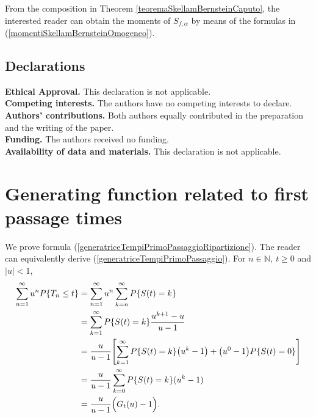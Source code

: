 \documentclass[12pt, twoside, english, headsepline]{article}
\theoremstyle{definition} %
\numberwithin{equation}{section} %
\begin{document}
From the composition in Theorem \ref{teoremaSkellamBernsteinCaputo}, the interested reader can obtain the moments of $S_{f,\alpha}$ by means of the formulas in (\ref{momentiSkellamBernsteinOmogeneo}).




\subsection*{\large{Declarations}}

\textbf{Ethical Approval.} This declaration is not applicable.
 \\
\textbf{Competing interests.}  The authors have no competing interests to declare.
\\
\textbf{Authors' contributions.} Both authors equally contributed in the preparation and the writing of the paper.
 \\
\textbf{Funding.} The authors received no funding.
 \\
\textbf{Availability of data and materials.} This declaration is not applicable.




 \appendix

\section{Generating function related to first passage times}\label{appendiceDimostrazioneFunzioneGeneratriceTempiPrimoPassaggio}

We prove formula (\ref{generatriceTempiPrimoPassaggioRipartizione}). The reader can equivalently derive (\ref{generatriceTempiPrimoPassaggio}).
For $n\in\mathbb{N},\ t\ge0$ and $|u|<1$,
\begin{align*}
\sum_{n=1}^\infty u^n P\{T_n \le t\} &= \sum_{n=1}^\infty u^n  \sum_{k=n}^\infty P\{S(t) = k\}\\
& = \sum_{k=1}^\infty  P\{S(t) = k\} \frac{u^{k+1}-u}{u-1} \\
& = \frac{u}{u-1}\Biggl[\sum_{k=1}^\infty P\{S(t) = k\} \big(u^k - 1\big) + \big(u^0-1\big)P\{S(t) = 0\}\Biggr] \\
&  = \frac{u}{u-1}\sum_{k=0}^\infty P\{S(t) = k\} (u^k-1)\\
& =\frac{u}{u-1}\Bigl(G_t(u) - 1\Bigr).
\end{align*}
\end{document}

